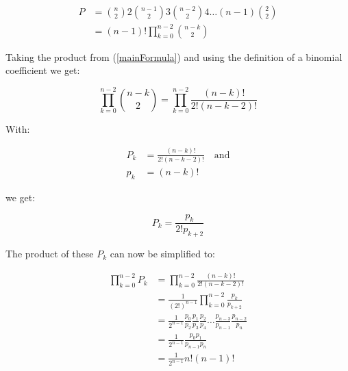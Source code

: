 \begin{equation}
\begin{aligned}
P & = \binom{n}{2} 2 \binom{n - 1}{2} 3 \binom{n - 2}{2} 4 \dots (n - 1) \binom{2}{2} \\
    & = (n - 1) ! \prod_{k = 0}^{n - 2} \binom{n - k}{2}
\end{aligned}
\label{mainFormula}
\end{equation}

Taking the product from (\ref{mainFormula}) and using the definition of a binomial coefficient we get:

\begin{equation}
 \prod_{k = 0}^{n - 2} \binom{n - k}{2} =  \prod_{k = 0}^{n - 2} \frac{(n - k) !}{2 ! (n - k - 2)!}
 \label{productPart}
\end{equation}

\noindent With:

\begin{equation}
\begin{aligned}
P_k & = \frac{(n - k) !}{2 ! (n - k - 2)!} \quad \text{and} \\
p_k & = (n - k) ! 
\end{aligned}
\end{equation}

\noindent we get:

\begin{equation}
P_k  = \frac{p_k}{2 ! p_{k + 2}} 
\end{equation}

\noindent The product of these $P_k$ can now be simplified to:

\begin{equation}
\begin{aligned}
 \prod_{k = 0}^{n - 2} P_k & =  \prod_{k = 0}^{n - 2} \frac{(n - k) !}{2 ! (n - k - 2)!} \\
                                              & = \frac{1}{(2!)^{n - 1}} \prod_{k = 0}^{n - 2} \frac{p_k}{p_{k + 2}} \\
                                              & = \frac{1}{2^{n - 1}} \frac{p_0}{p_2} \frac{p_1}{p_3} \frac{p_2}{p_4} \dots \frac{p_{n - 3}}{p_{n - 1}} \frac{p_{n - 2}}{p_n} \\
                                              & = \frac{1}{2^{n - 1}} \frac{p_0 p_1}{p_{n - 1} p_n} \\
                                              & = \frac{1}{2^{n - 1}}  n ! (n - 1) !
\end{aligned}
 \label{simplifiedFormula}
\end{equation}

